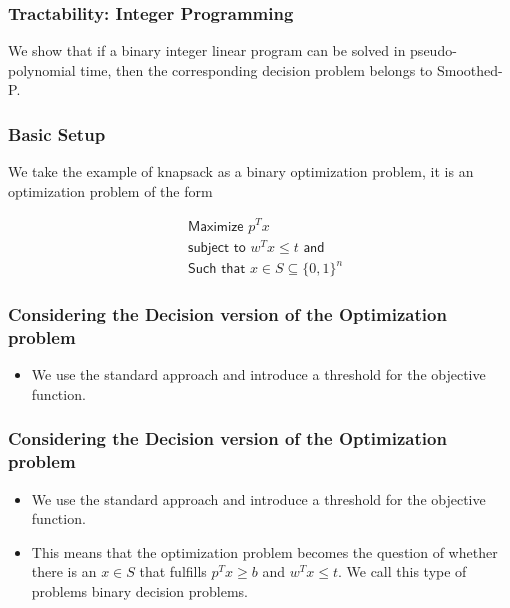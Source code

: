 \begin{frame}
    \frametitle{Tractability: Integer Programming}

    We show that if a binary integer linear program can be solved in
    pseudo-polynomial time, then the corresponding decision problem belongs to
    \textsf{Smoothed-P}.

\end{frame}

\begin{frame}
    \frametitle{Basic Setup}

    We take the example of knapsack as a binary optimization problem, it is an
    optimization problem of the form

    \begin{align*}
         & \textsf{Maximize } p^T x                         \\
         & \textsf{subject to } w^T x \leq t \textsf{ and } \\
         & \textsf{Such that } x \in S \subseteq \{0,1\}^n
    \end{align*}

\end{frame}

\begin{frame}
    \frametitle{Considering the Decision version of the Optimization problem}

    \begin{itemize}
        \item We use the standard approach and introduce a threshold for the objective
              function.
    \end{itemize}

\end{frame}

\begin{frame}
    \frametitle{Considering the Decision version of the Optimization problem}

    \begin{itemize}
        \item We use the standard approach and introduce a threshold for the objective
              function.
        \item This means that the optimization problem becomes the question of whether there
              is an $x \in S$ that fulfills $p^T x \geq b$ and $ w^T x \leq t$. We call this
              type of problems binary decision problems.
    \end{itemize}

\end{frame}

